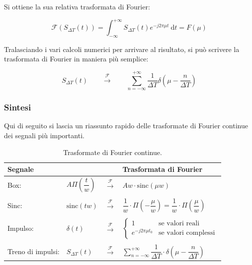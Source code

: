 \documentclass[a4paper]{article}
\begin{document}
	\noindent
	Si ottiene la sua relativa trasformata di Fourier:
	
	\begin{equation*}
		\mathcal{F}\left(S_{\Delta T}\left(t\right)\right) = \int_{-\infty}^{+\infty} S_{\Delta T}\left(t\right) e^{-j 2 \pi \mu t}\: \mathrm{d}t = F\left(\mu\right)
	\end{equation*}

	\noindent
	Tralasciando i vari calcoli numerici per arrivare al risultato, si può scrivere la trasformata di Fourier in maniera più semplice:
	
	\begin{equation*}
		S_{\Delta T}\left(t\right) \hspace{2em} \xrightarrow{\mathcal{F}} \hspace{2em} \sum_{n = -\infty}^{+\infty} \dfrac{1}{\Delta T} \delta\left(\mu - \dfrac{n}{\Delta T}\right)
	\end{equation*}

	\newpage
	
	\subsubsection{Sintesi}
	
	Qui di seguito si lascia un riassunto rapido delle trasformate di Fourier continue dei segnali più importanti.
	
	\begin{table}[!htbp]
		\centering
		\begin{tabular}{@{} l l c l @{}}
			\toprule
			Segnale & & & Trasformata di Fourier \\
			\midrule
			Box:				& $A\Pi\left(\dfrac{t}{w}\right)$	& $\xrightarrow{\mathcal{F}}$ & $Aw \cdot \mathrm{sinc}\left(\mu w\right)$ \\
			&&&\\
			Sinc:				& $\mathrm{sinc}\left(tw\right)$	& $\xrightarrow{\mathcal{F}}$ & $\dfrac{1}{w}\cdot\Pi \left(-\dfrac{\mu}{w}\right) = \dfrac{1}{w}\cdot \Pi\left(\dfrac{\mu}{w}\right)$ \\
			&&&\\
			Impulso:			& $\delta\left(t\right)$			& $\xrightarrow{\mathcal{F}}$ &
			$\begin{cases}
				1 						& \text{se valori reali}\\
				e^{-j 2 \pi \mu t_{0}}	& \text{se valori complessi}
			\end{cases}$ \\
			&&&\\
			Treno di impulsi:	& $S_{\Delta T}\left(t\right)$ 		& $\xrightarrow{\mathcal{F}}$ & $\displaystyle\sum_{n = -\infty}^{+\infty} \dfrac{1}{\Delta T} \cdot \delta \left(\mu - \dfrac{n}{\Delta T}\right)$ \\
			\bottomrule
		\end{tabular}
		\caption{Trasformate di Fourier continue.}
	\end{table}
\end{document}
